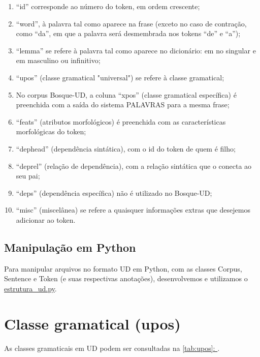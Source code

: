 \documentclass[output=paper,colorlinks,citecolor=brown]{langscibook}
\newcommand*{\fullref}[1]{\hyperref[{#1}]{\autoref*{#1}: \nameref*{#1}}} %
\begin{document}
\begin{enumerate}
    \item “id” corresponde ao número do token, em ordem crescente;
    \item “word”, à palavra tal como aparece na frase (exceto no caso de contração, como “da”, em que a palavra será desmembrada nos tokens “de” e “a”);
    \item “lemma” se refere à palavra tal como aparece no dicionário: em no singular e em masculino ou infinitivo;
    \item “upos” (classe gramatical "universal") se refere à classe gramatical;
    \item No corpus Bosque-UD, a coluna “xpos” (classe gramatical específica) é preenchida com a saída do sistema PALAVRAS para a mesma frase;
    \item “feats” (atributos morfológicos) é preenchida com as características morfológicas do token;
    \item “dephead” (dependência sintática), com o id do token de quem é filho;
    \item “deprel” (relação de dependência), com a relação sintática que o conecta ao seu pai;
    \item “deps” (dependência específica) não é utilizado no Bosque-UD;
    \item “misc” (miscelânea) se refere a quaisquer informações extras que desejemos adicionar ao token.
\end{enumerate}{}

\subsection{Manipulação em Python}\label{sec:python}

Para manipular arquivos no formato UD em Python, com as classes Corpus, Sentence e Token (e suas respectivas anotações), desenvolvemos e utilizamos o \href{https://github.com/alvelvis/ACDC-UD/blob/master/estrutura_ud.py}{estrutura\_ud.py}.

\section{Classe gramatical (upos)}\label{sec:upos}

As classes gramaticais em UD podem ser consultadas na \fullref{tab:upos}.
\end{document}
